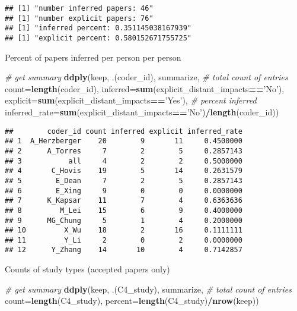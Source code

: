 \documentclass[
]{article}
\newenvironment{Shaded}{\begin{snugshade}}{\end{snugshade}}
\newcommand{\CommentTok}[1]{\textcolor[rgb]{0.56,0.35,0.01}{\textit{#1}}}
\newcommand{\DataTypeTok}[1]{\textcolor[rgb]{0.13,0.29,0.53}{#1}}
\newcommand{\KeywordTok}[1]{\textcolor[rgb]{0.13,0.29,0.53}{\textbf{#1}}}
\newcommand{\NormalTok}[1]{#1}
\newcommand{\OperatorTok}[1]{\textcolor[rgb]{0.81,0.36,0.00}{\textbf{#1}}}
\newcommand{\StringTok}[1]{\textcolor[rgb]{0.31,0.60,0.02}{#1}}
\begin{document}
\begin{verbatim}
## [1] "number inferred papers: 46"
## [1] "number explicit papers: 76"
## [1] "inferred percent: 0.351145038167939"
## [1] "explicit percent: 0.580152671755725"
\end{verbatim}

Percent of papers inferred per person per person

\begin{Shaded}
\begin{Highlighting}[]
\CommentTok{# get summary}
  \KeywordTok{ddply}\NormalTok{(keep, .(coder_id), summarize,}
        \CommentTok{# total count of entries     }
        \DataTypeTok{count=}\KeywordTok{length}\NormalTok{(coder_id),}
        \DataTypeTok{inferred=}\KeywordTok{sum}\NormalTok{(explicit_distant_impacts}\OperatorTok{==}\StringTok{'No'}\NormalTok{),}
        \DataTypeTok{explicit=}\KeywordTok{sum}\NormalTok{(explicit_distant_impacts}\OperatorTok{==}\StringTok{'Yes'}\NormalTok{),}
        \CommentTok{# percent inferred}
        \DataTypeTok{inferred_rate=}\KeywordTok{sum}\NormalTok{(explicit_distant_impacts}\OperatorTok{==}\StringTok{'No'}\NormalTok{)}\OperatorTok{/}\KeywordTok{length}\NormalTok{(coder_id))}
\end{Highlighting}
\end{Shaded}

\begin{verbatim}
##        coder_id count inferred explicit inferred_rate
## 1  A_Herzberger    20        9       11     0.4500000
## 2      A_Torres     7        2        5     0.2857143
## 3           all     4        2        2     0.5000000
## 4       C_Hovis    19        5       14     0.2631579
## 5        E_Dean     7        2        5     0.2857143
## 6        E_Xing     9        0        0     0.0000000
## 7      K_Kapsar    11        7        4     0.6363636
## 8         M_Lei    15        6        9     0.4000000
## 9      MG_Chung     5        1        4     0.2000000
## 10         X_Wu    18        2       16     0.1111111
## 11         Y_Li     2        0        2     0.0000000
## 12      Y_Zhang    14       10        4     0.7142857
\end{verbatim}

Counts of study types (accepted papers only)

\begin{Shaded}
\begin{Highlighting}[]
\CommentTok{# get summary}
  \KeywordTok{ddply}\NormalTok{(keep, .(C4_study), summarize,}
        \CommentTok{# total count of entries     }
        \DataTypeTok{count=}\KeywordTok{length}\NormalTok{(C4_study),}
        \DataTypeTok{percent=}\KeywordTok{length}\NormalTok{(C4_study)}\OperatorTok{/}\KeywordTok{nrow}\NormalTok{(keep))}
\end{Highlighting}
\end{Shaded}
\end{document}
